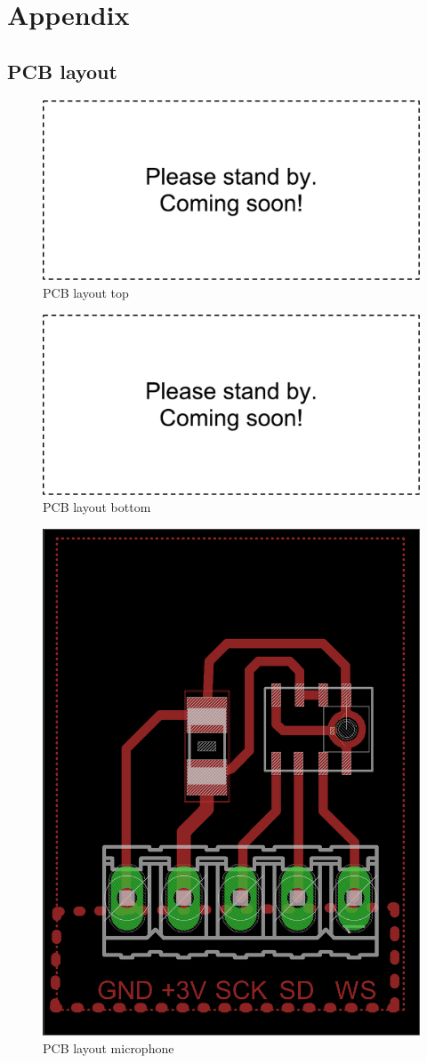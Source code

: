 \chapter{Appendix}

\section{PCB layout}
\begin{figure}[htb]
\includegraphics[width=\columnwidth]{Images/dummy}
\caption{PCB layout top}
\label{fig:pcb_layout_top}
\end{figure}

\begin{figure}[htb]
\includegraphics[width=\columnwidth]{Images/dummy}
\caption{PCB layout bottom}
\label{fig:pcb_layout_bottom}
\end{figure}

\begin{figure}[htb]
\centering
\includegraphics[width=0.4\columnwidth]{Images/pcb_layout_mic}
\caption{PCB layout microphone}
\label{fig:pcb_layout_mic}
\end{figure}

